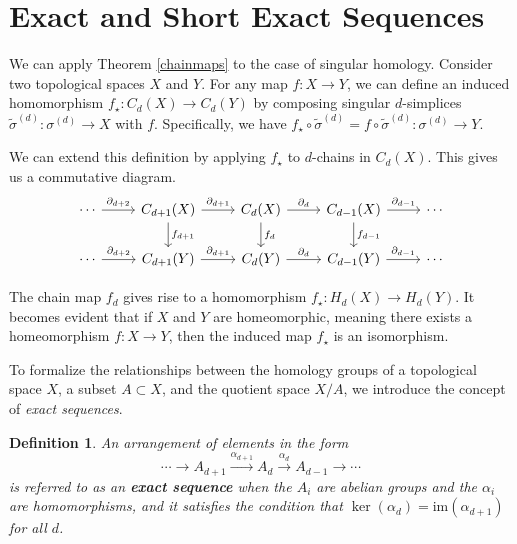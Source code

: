 \documentclass{amsart}
\newtheorem{definition}{Definition}[section]
\begin{document}
\section{Exact and Short Exact Sequences}
We can apply Theorem \ref{chainmaps} to the case of singular homology. Consider two topological spaces $X$ and $Y$. For any map $f: X \rightarrow Y$, we can define an induced homomorphism $f_\star: C_d(X) \rightarrow C_d(Y)$ by composing singular $d$-simplices $\tilde{\sigma}^{(d)}: \sigma^{(d)} \rightarrow X$ with $f$. Specifically, we have $f_\star \circ \tilde{\sigma}^{(d)} = f \circ \tilde{\sigma}^{(d)}: \sigma^{(d)} \rightarrow Y$.

We can extend this definition by applying $f_\star$ to $d$-chains in $C_d(X)$. This gives us a commutative diagram.
\begin{equation}
\begin{tikzcd}
\cdots \arrow[r, "\partial_{d+2}"] & C_{d+1}(X) \arrow[r, "\partial_{d+1}"] \arrow[d, "f_{d+1}"] & C_d(X) \arrow[r, "\partial_d"] \arrow[d, "f_d"] & C_{d-1}(X) \arrow[r, "\partial_{d-1}"] \arrow[d, "f_{d-1}"] & \cdots \\
\cdots \arrow[r, "\partial_{d+2}"] & C_{d+1}(Y) \arrow[r, "\partial_{d+1}"]                                  & C_d(Y) \arrow[r, "\partial_d"]                              & C_{d-1}(Y) \arrow[r, "\partial_{d-1}"]                                  & \cdots
\end{tikzcd}
\end{equation}

The chain map $f_d$ gives rise to a homomorphism $f_\star: H_d(X) \rightarrow H_d(Y)$. It becomes evident that if $X$ and $Y$ are homeomorphic, meaning there exists a homeomorphism $f: X \rightarrow Y$, then the induced map $f_\star$ is an isomorphism.

To formalize the relationships between the homology groups of a topological space $X$, a subset $A \subset X$, and the quotient space $X/A$, we introduce the concept of \emph{exact sequences}.

\begin{definition}
An arrangement of elements in the form \begin{equation}
\cdots \rightarrow A_{d+1} \xrightarrow{\alpha_{d+1}} A_{d} \xrightarrow{\alpha_d} A_{d-1} \xrightarrow{} \cdots
\end{equation}
is referred to as an \textbf{exact sequence} when the $A_i$ are abelian groups and the $\alpha_i$ are homomorphisms, and it satisfies the condition that $\ker(\alpha_d) = \text{im}(\alpha_{d+1})$ for all $d$.\end{definition}
\end{document}
